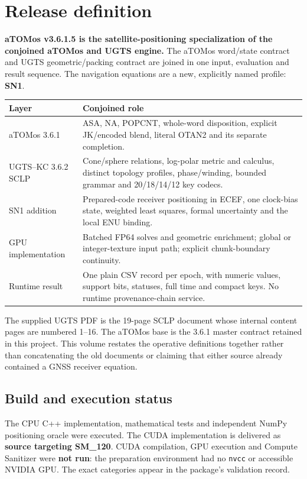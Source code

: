 \documentclass[11pt,a4paper]{article}
\newcommand{\code}[1]{\texttt{#1}}
\begin{document}
\section*{Release definition}
\textbf{aTOMos v3.6.1.5 is the satellite-positioning specialization of the conjoined aTOMos and UGTS engine.}
The aTOMos word/state contract and UGTS geometric/packing contract are joined in one input, evaluation and
result sequence. The navigation equations are a new, explicitly named profile: \textbf{SN1}.

\begin{center}
\begin{tabularx}{\textwidth}{@{}P{.30\textwidth}Y@{}}\toprule
\textbf{Layer} & \textbf{Conjoined role}\\\midrule
aTOMos 3.6.1 & ASA, NA, POPCNT, whole-word disposition, explicit JK/encoded blend, literal OTAN2 and its separate completion.\\
UGTS--KC 3.6.2 SCLP & Cone/sphere relations, log-polar metric and calculus, distinct topology profiles, phase/winding, bounded grammar and 20/18/14/12 key codecs.\\
SN1 addition & Prepared-code receiver positioning in ECEF, one clock-bias state, weighted least squares, formal uncertainty and the local ENU binding.\\
GPU implementation & Batched FP64 solves and geometric enrichment; global or integer-texture input path; explicit chunk-boundary continuity.\\
Runtime result & One plain CSV record per epoch, with numeric values, support bits, statuses, full time and compact keys. No runtime provenance-chain service.\\\bottomrule
\end{tabularx}
\end{center}

The supplied UGTS PDF is the 19-page SCLP document whose internal content pages are numbered 1--16.
The aTOMos base is the 3.6.1 master contract retained in this project. This volume restates the operative
definitions together rather than concatenating the old documents or claiming that either source already
contained a GNSS receiver equation.

\subsection*{Build and execution status}
The CPU C++ implementation, mathematical tests and independent NumPy positioning oracle were executed.
The CUDA implementation is delivered as \textbf{source targeting SM\_120}. CUDA compilation, GPU execution
and Compute Sanitizer were \textbf{not run}: the preparation environment had no \code{nvcc} or accessible NVIDIA GPU.
The exact categories appear in the package's validation record.
\end{document}
